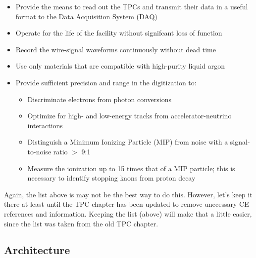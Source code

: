 \begin{itemize}	
\item Provide the means to read out the TPCs and transmit their data in a useful format to the Data Acquisition System (DAQ)
\item Operate for the life of the facility without signifcant loss of function
\item Record the wire-signal waveforms continuously without dead time
\item Use only materials that are compatible with high-purity liquid argon
\item Provide sufficient precision and range in the digitization to:
\begin{itemize}
\item Discriminate electrons from photon conversions
\item Optimize for high- and low-energy tracks from accelerator-neutrino interactions
\item Distinguish a Minimum Ionizing Particle (MIP) from noise with a signal-to-noise ratio $>$ 9:1
\item Measure the ionization up to 15 times that of a MIP particle;
this is necessary to identify stopping kaons from proton decay
\end{itemize}
\end{itemize}

\begin{editornote}
  Again, the list above is may not be the best way to do this.
  However, let's keep it there at least until the TPC chapter has been
  updated to remove unecessary CE references and information.
  Keeping the list (above) will make that a little easier, since the list was taken from the old TPC chapter.
\end{editornote}



\subsection{Architecture}
\label{subsec:fe-arch}



